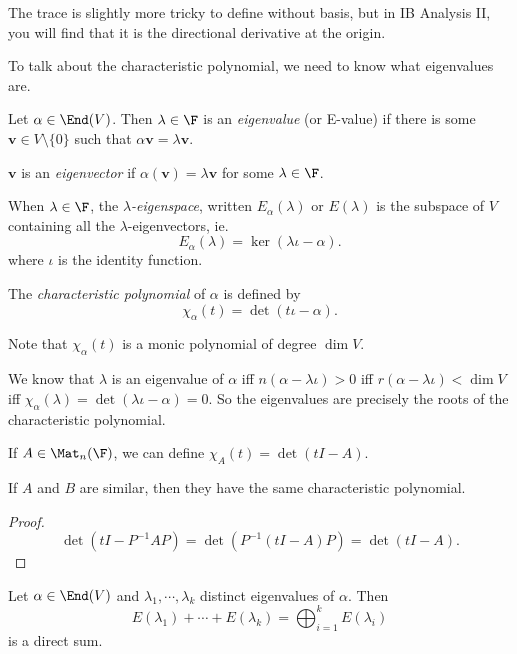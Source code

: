 \documentclass[a4paper]{article}
\begin{document}
The trace is slightly more tricky to define without basis, but in IB Analysis II, you will find that it is the directional derivative at the origin.

To talk about the characteristic polynomial, we need to know what eigenvalues are.
\begin{defi}
  Let $\alpha \in \End(V)$. Then $\lambda \in \F$ is an \emph{eigenvalue} (or E-value) if there is some $\mathbf{v} \in V\setminus \{0\}$ such that $\alpha \mathbf{v} = \lambda \mathbf{v}$.

  $\mathbf{v}$ is an \emph{eigenvector} if $\alpha(\mathbf{v}) = \lambda \mathbf{v}$ for some $\lambda \in \F$.

  When $\lambda \in \F$, the \emph{$\lambda$-eigenspace}, written $E_\alpha(\lambda)$ or $E(\lambda)$ is the subspace of $V$ containing all the $\lambda$-eigenvectors, ie.
  \[
    E_\alpha(\lambda) = \ker (\lambda \iota - \alpha).
  \]
  where $\iota$ is the identity function.

  The \emph{characteristic polynomial} of $\alpha$ is defined by
  \[
    \chi_\alpha(t) = \det (t\iota - \alpha).
  \]
\end{defi}
Note that $\chi_\alpha(t)$ is a monic polynomial of degree $\dim V$.

We know that $\lambda$ is an eigenvalue of $\alpha$ iff $n(\alpha - \lambda \iota) > 0$ iff $r(\alpha - \lambda \iota) < \dim V$ iff $\chi_\alpha(\lambda) = \det(\lambda \iota - \alpha) = 0$. So the eigenvalues are precisely the roots of the characteristic polynomial.

If $A \in \Mat_n(\F)$, we can define $\chi_A(t) = \det (tI - A)$.
\begin{lemma}
  If $A$ and $B$ are similar, then they have the same characteristic polynomial.
\end{lemma}

\begin{proof}
  \[
    \det (tI - P^{-1}AP) = \det(P^{-1}(tI - A)P) = \det(tI - A).
  \]
\end{proof}

\begin{lemma}
  Let $\alpha \in \End(V)$ and $\lambda_1, \cdots, \lambda_k$ distinct eigenvalues of $\alpha$. Then
  \[
    E(\lambda_1) + \cdots + E(\lambda_k) = \bigoplus_{i = 1}^k E(\lambda_i)
  \]
  is a direct sum.
\end{lemma}
\end{document}
